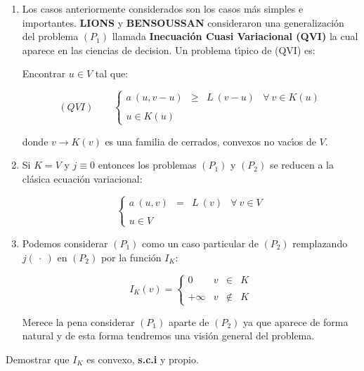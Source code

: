 \begin{enumerate}
\item Los casos anteriormente considerados son los casos m\'as simples e
importantes. \textbf{LIONS} y \textbf{BENSOUSSAN} consideraron una
generalizaci\'on del problema $(P_1)$ llamada \textbf{Inecuaci\'on Cuasi
Variacional (QVI)} la cual aparece en las ciencias de decision. Un problema
t\'{\i}pico de (QVI) es:\newline

Encontrar $u \in V$ tal que:

\begin{equation} \label{eq:QVI}
(QVI) \qquad \left\{ \begin{array}{lrlr}
a \ (u,v-u) & \ge & L \ (v-u) & \forall \ v \in K(u) \\
\\
u \in K(u)
\end{array} \right.
\end{equation}

donde $v \longrightarrow K(v)$ es una familia de cerrados, convexos no
vac\'{\i}os de $V$.

\item Si $K = V$ y $j \equiv 0$ entonces los problemas $(P_1)$ y $(P_2)$ se
reducen a la cl\'asica ecuaci\'on variacional:

\begin{equation} \label{eq:variacional}
\left\{ \begin{array}{lrlr}
a \ (u,v) & = & L \ (v) & \forall \ v \in V \\
\\
u \in V
\end{array} \right.
\end{equation}

\item Podemos considerar $(P_1)$ como un caso particular de $(P_2)$ remplazando
$j(\ \cdot \ )$ en $(P_2)$ por la funci\'on $I_K$:

\begin{equation} \label{eq:defiIK}
I_K(v) = \left\{ \begin{array}{cccc}
0 & v & \in & K \\
\\
+ \infty & v & \notin & K
\end{array} \right.
\end{equation}

Merece la pena considerar $(P_1)$ aparte de $(P_2)$ ya que aparece de forma
natural y de esta forma tendremos una visi\'on general del problema.
\end{enumerate}
\newpage
\begin{ejercicio}
Demostrar que $I_K$ es convexo, \textbf{s.c.i} y propio.
\end{ejercicio}

